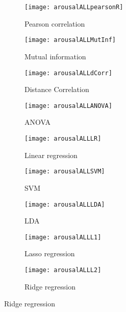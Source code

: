 \npar



\clearpage
\begin{figure}[!tbp]
  \centering
  \begin{subfigure}[b]{0.3\textwidth}
    \texttt{[image: arousalALLpearsonR]}
    \caption{Pearson correlation}
  \end{subfigure}
  \hfill
  \begin{subfigure}[b]{0.3\textwidth}
    \texttt{[image: arousalALLMutInf]}
    \caption{Mutual information}
  \end{subfigure}
  \hfill
  \begin{subfigure}[b]{0.3\textwidth}
    \texttt{[image: arousalALLdCorr]}
    \caption{Distance Correlation}
  \end{subfigure}
  
  \begin{subfigure}[b]{0.3\textwidth}
    \texttt{[image: arousalALLANOVA]}
    \caption{ANOVA}
  \end{subfigure}
  \hfill
  \begin{subfigure}[b]{0.3\textwidth}
    \texttt{[image: arousalALLLR]}
    \caption{Linear regression}
  \end{subfigure}
  \hfill
  \begin{subfigure}[b]{0.3\textwidth}
    \texttt{[image: arousalALLSVM]}
    \caption{SVM}
  \end{subfigure}
  
  \begin{subfigure}[b]{0.3\textwidth}
    \texttt{[image: arousalALLLDA]}
    \caption{LDA}
  \end{subfigure}
  \hfill
  \begin{subfigure}[b]{0.3\textwidth}
    \texttt{[image: arousalALLL1]}
    \caption{Lasso regression}
  \end{subfigure}
  \hfill
  \begin{subfigure}[b]{0.3\textwidth}
    \texttt{[image: arousalALLL2]}
    \caption{Ridge regression}
  \end{subfigure}
  

\end{figure}
